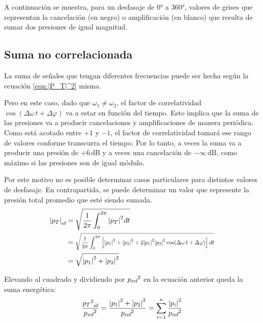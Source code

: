 \documentclass[a5paper,12pt,twoside]{book}
\begin{document}
A continuación se muestra, para un desfasaje de $\ang{0}$ a $\ang{360}$, valores de grises que representan la cancelación (en negro) o amplificación (en blanco) que resulta de sumar dos presiones de igual magnitud.

\begin{center}
    \def\svgwidth{0.5\linewidth}
    
\end{center}


\subsection{Suma no correlacionada}

La suma de señales que tengan diferentes frecuencias puede ser hecha según la ecuación \ref{eqn:|P_T|^2} misma.

Pero en este caso, dado que $\omega_1\neq\omega_2$, el factor de correlatividad $\cos(\Delta \omega \, t + \Delta \varphi)$ va a estar en función del tiempo.
Esto implica que la suma de las presiones va a producir cancelaciones y amplificaciones de manera periódica.
Como está acotado entre $+1$ y $-1$, el factor de correlatividad tomará ese rango de valores conforme transcurra el tiempo.
Por lo tanto, a veces la suma va a producir una presión de $+6\,\si{\deci\bel}$ y a veces una cancelación de $-\infty\,\si{\deci\bel}$, como máximo si las presiones son de igual módulo.

Por este motivo no es posible determinar casos particulares para distintos valores de desfasaje.
En contrapartida, se puede determinar un valor que represente la presión total promedio que esté siendo sumada.
\begin{align*}
    \rms{\norm{p_T}} &= \sqrt{\frac{1}{2\pi} \int_0^{2\pi} \norm{p_T}^2 \dif t}
    \\
    &= \scale{0.8}{\sqrt{\frac{1}{2\pi} \int_0^{2\pi} \left[ \norm{p_1}^2 + \norm{p_2}^2 + 2 \norm{p_1}^2 \norm{p_2}^2 \cos( \Delta \omega \, t + \Delta \varphi) \right] \dif t}}
    \\
    &= \sqrt{\norm{p_1}^2 + \norm{p_2}^2}
\end{align*}

Elevando al cuadrado y dividiendo por ${{p}_\textsl{{ref}}}^2$ en la ecuación anterior queda la suma energética:
\begin{equation*}
    \frac{{{{{p_T}^2}_\textsl{{ef}}}}}{{{p}_\textsl{{ref}}}^2} = \frac{{\left| {p_1} \right|}^2+{\left| {p_2} \right|}^2}{{{p}_\textsl{{ref}}}^2} = \sum_{i=1}^n \frac{{\left| {p_i} \right|}^2}{{{p}_\textsl{{ref}}}^2}
\end{equation*}
\end{document}
